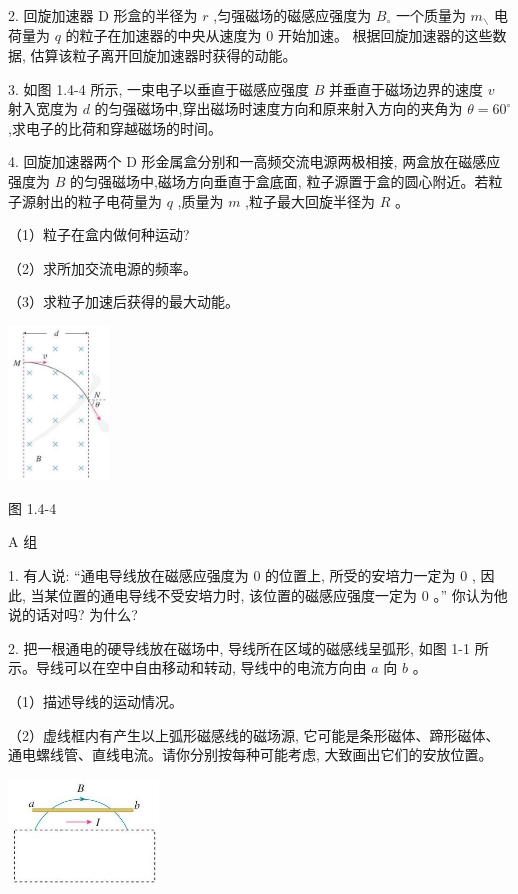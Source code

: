 \documentclass[10pt]{article}
\begin{document}
2. 回旋加速器 \(\mathrm{D}\) 形盒的半径为 \(r\) ,匀强磁场的磁感应强度为 \({B}_{ \circ }\) 一个质量为 \({m}_{ \smallsetminus }\) 电荷量为 \(q\) 的粒子在加速器的中央从速度为 0 开始加速。 根据回旋加速器的这些数据, 估算该粒子离开回旋加速器时获得的动能。

3. 如图 1.4-4 所示, 一束电子以垂直于磁感应强度 \(B\) 并垂直于磁场边界的速度 \(v\) 射入宽度为 \(d\) 的匀强磁场中,穿出磁场时速度方向和原来射入方向的夹角为 \(\theta = {60}^{ \circ }\) ,求电子的比荷和穿越磁场的时间。

4. 回旋加速器两个 \(\mathrm{D}\) 形金属盒分别和一高频交流电源两极相接, 两盒放在磁感应强度为 \(B\) 的匀强磁场中,磁场方向垂直于盒底面, 粒子源置于盒的圆心附近。若粒子源射出的粒子电荷量为 \(q\) ,质量为 \(m\) ,粒子最大回旋半径为 \(R\) 。

（1）粒子在盒内做何种运动?

（2）求所加交流电源的频率。

（3）求粒子加速后获得的最大动能。

\begin{center}
\includegraphics[max width=0.2\textwidth]{images/01910e72-c5b7-7ed5-a6d4-fb3a5faefc32_25_896161.jpg}
\end{center}

图 1.4-4

A 组

1. 有人说: “通电导线放在磁感应强度为 0 的位置上, 所受的安培力一定为 0 , 因此, 当某位置的通电导线不受安培力时, 该位置的磁感应强度一定为 0 。” 你认为他说的话对吗? 为什么?

2. 把一根通电的硬导线放在磁场中, 导线所在区域的磁感线呈弧形, 如图 1-1 所示。导线可以在空中自由移动和转动, 导线中的电流方向由 \(a\) 向 \(b\) 。

（1）描述导线的运动情况。

（2）虚线框内有产生以上弧形磁感线的磁场源, 它可能是条形磁体、蹄形磁体、通电螺线管、直线电流。请你分别按每种可能考虑, 大致画出它们的安放位置。

\begin{center}
\includegraphics[max width=0.3\textwidth]{images/01910e72-c5b7-7ed5-a6d4-fb3a5faefc32_26_346378.jpg}
\end{center}
\end{document}
